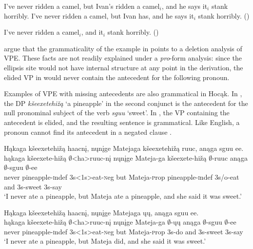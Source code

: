\documentclass[output=paper]{LSP/langsci}
\begin{document}
 
\ea
\ea\label{ex:johnson:49a}
I've never ridden a camel, but Ivan's ridden a camel$_i$, and he says it$_i$ stank horribly.
\vspace{12pt}
\ex\label{ex:johnson:49b} 
I've never ridden a camel, but Ivan has, and he says it$_i$ stank horribly. (\citealt[403]{HankamerSag1976})
\z
\z
 
\ea\label{ex:johnson:50}
I've never ridden a camel$_i$, and it$_i$ stank horribly. (\citealt[404]{HankamerSag1976})
\z 

\citet{HankamerSag1976} argue that the grammaticality of the example in  points to a deletion analysis of VPE. These facts are not readily explained under a \emph{pro}-form analysis: since the ellipsis site would not have internal structure at any point in the derivation, the elided VP in  would never contain the antecedent for the following pronoun. 

Examples of VPE with missing antecedents are also grammatical in Hocąk. In , the DP \emph{kšeexetehižą} `a pineapple' in the second conjunct is the antecedent for the null pronominal subject of the verb \emph{sguu} `sweet'. In , the VP containing the antecedent is elided, and the resulting sentence is grammatical. Like English, a pronoun cannot find its antecedent in a negated clause .
 
\ea
\ea\label{ex:johnson:51a} 
\glll Hąkaga kšeexetehižą haacnį, nųnįge Matejaga kšeexetehižą ruuc, anąga sguu ee.\\
hąkaga kšeexete-hižą $\emptyset$<ha>ruuc-nį nųnįge Mateja-ga kšeexete-hižą $\emptyset$-ruuc anąga $\emptyset$-sguu $\emptyset$-ee\\
never pineapple-{\textsc indef} {\textsc 3s<1s>}eat-{\textsc neg} but Mateja-{\textsc prop} pineapple-{\textsc indef} {\textsc 3s/o}-eat and {\textsc 3s}-sweet {\textsc 3s}-say\\
\trans `I never ate a pineapple, but Mateja ate a pineapple, and she said it was sweet.'
 
\ex\label{ex:johnson:51b} 
\glll Hąkaga kšeexetehižą haacnį, nųnįge Matejaga ųų, anąga sguu ee.\\
hąkaga kšeexete-hižą $\emptyset$<ha>ruuc-nį nųnįge Mateja-ga $\emptyset$-ųų anąga $\emptyset$-sguu $\emptyset$-ee\\
never pineapple-{\textsc indef} {\textsc 3s<1s>}eat-{\textsc neg} but Mateja-{\textsc prop} {\textsc 3s}-do and {\textsc 3s}-sweet {\textsc 3s}-say\\
\trans `I never ate a pineapple, but Mateja did, and she said it was sweet.'
\z
\z
 
\end{document}
